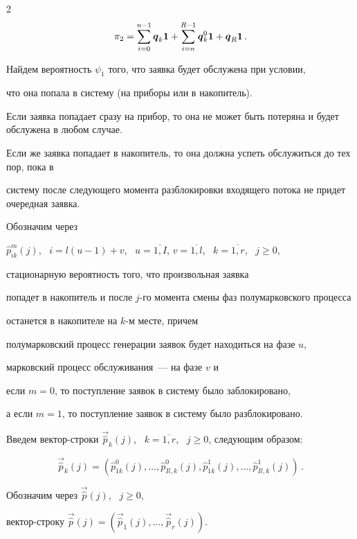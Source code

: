 \begin{multicols}{2}
\begin{equation}
\label{pi_2}


\pi_2 =\sum\limits_{i=0}^{n-1}\vec{q}_k {\bf 1}+\sum\limits_{i=n}^{R-1}\vec{q}^0_k {\bf 1}+\vec{q}_R {\bf 1}\,.


\end{equation}





Найдем вероятность $\psi_1$ того, что заявка будет обслужена при условии,


что она попала в систему (на приборы или в накопитель).


Если заявка попадает сразу на прибор, то она не может быть потеряна и будет обслужена в любом случае.


Если же заявка попадает в накопитель, то она должна успеть обслужиться до тех пор, пока в


систему после следующего момента разблокировки входящего потока не придет очередная заявка.





Обозначим через


$\hat p_{ik}^m(j)$, \ $i=l(u-1)+v$, \ $u=\overline{1,I}$,  $v=\overline{1,l}$, \ $k=\overline{1,r}$, \ $j\ge 0$,


стационарную вероятность того, что произвольная заявка


попадет в накопитель и после $j$-го момента смены фаз полумарковского процесса


останется в накопителе на $k$-м месте, причем


полумарковский процесс генерации заявок будет находиться на фазе $u$,


марковский процесс обслуживания~--- на фазе $v$ и


если $m=0$, то поступление заявок в систему было заблокировано,


а если $m=1$, то поступление заявок в систему было разблокировано.


Введем вектор-строки $\vec{\hat p}_k(j)$, \ $k=\overline{1,r}$, \ $j\ge 0$, следующим образом:


$$


\vec{\hat p}_k(j)=(\hat p_{1k}^0(j),\ldots,\hat p_{Il,k}^0(j),\hat p_{1k}^1(j),\ldots,\hat p_{Il,k}^1(j))\,.


$$





Обозначим через $\vec{\hat p}(j)$, \ $j\ge 0$,


вектор-строку $\vec{\hat p}(j)=(\vec{\hat p}_{1}(j),\ldots,\vec{\hat p}_{r}(j))$.



\end{multicols}
